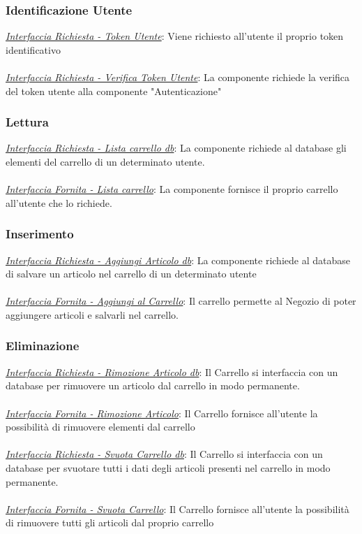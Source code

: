 \documentclass{report}
\begin{document}
\subsubsection*{\indent \indent Identificazione Utente}
\textcolor{Auth}{\uline{\textit{Interfaccia Richiesta - Token Utente}}}: 
Viene richiesto all'utente il proprio token identificativo\\ \\
\textcolor{Auth}{\uline{\textit{Interfaccia Richiesta - Verifica Token Utente}}}: 
La componente richiede la verifica del token utente alla componente "Autenticazione"
\subsubsection*{\indent \indent Lettura}
\textcolor{Database}{\uline{\textit{Interfaccia Richiesta - Lista carrello db}}}: 
La componente richiede al database gli elementi del carrello di un determinato utente. \\\\
\uline{\textit{Interfaccia Fornita - Lista carrello}}: 
La componente fornisce il proprio carrello all'utente che lo richiede.
\subsubsection*{\indent \indent Inserimento}
\textcolor{Database}{\uline{\textit{Interfaccia Richiesta - Aggiungi Articolo db}}}:
 La componente richiede al database di salvare un articolo nel carrello di un determinato utente\\\\ 
\uline{\textit{Interfaccia Fornita - Aggiungi al Carrello}}: 
Il carrello permette al Negozio di poter aggiungere articoli e salvarli nel carrello.
\subsubsection*{\indent \indent Eliminazione}
\textcolor{Database}{\uline{\textit{Interfaccia Richiesta - Rimozione Articolo db}}}: 
Il Carrello si interfaccia con un database per rimuovere un articolo dal carrello in modo permanente.\\ \\
\uline{\textit{Interfaccia Fornita - Rimozione Articolo}}: 
Il Carrello fornisce all'utente la possibilità di rimuovere elementi dal carrello\\\\
\textcolor{Database}{\uline{\textit{Interfaccia Richiesta - Svuota Carrello db}}}: 
Il Carrello si interfaccia con un database per svuotare tutti i dati degli articoli presenti nel carrello in modo permanente.\\ \\
\uline{\textit{Interfaccia Fornita - Svuota Carrello}}:
Il Carrello fornisce all'utente la possibilità di rimuovere tutti gli articoli dal proprio carrello
\end{document}
